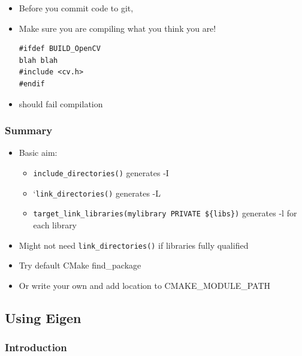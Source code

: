 \begin{itemize}
\item
  Before you commit code to git,
\item
  Make sure you are compiling what you think you are!

\begin{verbatim}
#ifdef BUILD_OpenCV
blah blah
#include <cv.h>
#endif
\end{verbatim}
\item
  should fail compilation
\end{itemize}

\subsubsection{Summary}\label{summary-2}

\begin{itemize}
\itemsep1pt\parskip0pt
\item
  Basic aim:

  \begin{itemize}
  \itemsep1pt\parskip0pt
  \item
    \texttt{include\_directories()} generates -I
  \item
    `\texttt{link\_directories()} generates -L
  \item
    \texttt{target\_link\_libraries(mylibrary PRIVATE \$\{libs\})}
    generates -l for each library
  \end{itemize}
\item
  Might not need \texttt{link\_directories()} if libraries fully
  qualified
\item
  Try default CMake find\_package
\item
  Or write your own and add location to CMAKE\_MODULE\_PATH
\end{itemize}

\subsection{Using Eigen}\label{using-eigen}

\subsubsection{Introduction}\label{introduction}


